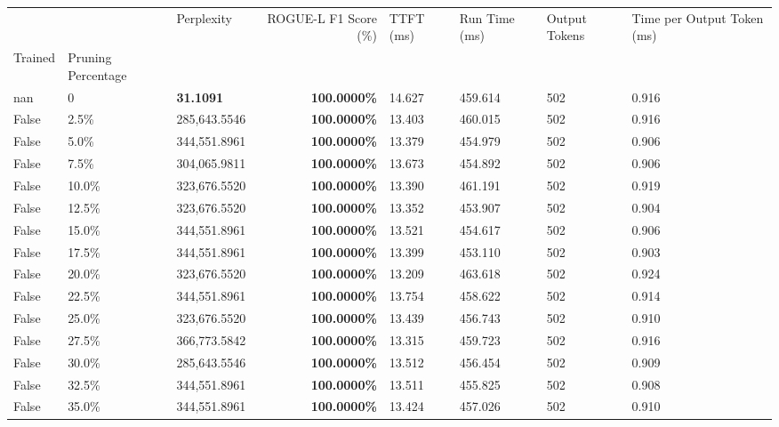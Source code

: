 \begin{table}[H]
\label{tab:evaluation-pipeline-11-untrained}
\begin{tabular}{lllrllll}
\toprule
 &  & Perplexity & ROGUE-L F1 Score (\%) & TTFT (ms) & Run Time (ms) & Output Tokens & Time per Output Token (ms) \\
Trained & Pruning Percentage &  &  &  &  &  &  \\
\midrule
nan & 0 & \bfseries 31.1091 & \bfseries 100.0000\% & 14.627 & 459.614 & 502 & 0.916 \\
\cline{1-8}
False & 2.5\% & \color{red} 285,643.5546 & \bfseries \color{red} 100.0000\% & 13.403 & 460.015 & 502 & 0.916 \\
\cline{1-8}
False & 5.0\% & 344,551.8961 & \bfseries \color{red} 100.0000\% & 13.379 & 454.979 & 502 & 0.906 \\
\cline{1-8}
False & 7.5\% & 304,065.9811 & \bfseries \color{red} 100.0000\% & 13.673 & 454.892 & 502 & 0.906 \\
\cline{1-8}
False & 10.0\% & 323,676.5520 & \bfseries \color{red} 100.0000\% & 13.390 & 461.191 & 502 & 0.919 \\
\cline{1-8}
False & 12.5\% & 323,676.5520 & \bfseries \color{red} 100.0000\% & 13.352 & 453.907 & 502 & 0.904 \\
\cline{1-8}
False & 15.0\% & 344,551.8961 & \bfseries \color{red} 100.0000\% & 13.521 & 454.617 & 502 & 0.906 \\
\cline{1-8}
False & 17.5\% & 344,551.8961 & \bfseries \color{red} 100.0000\% & 13.399 & 453.110 & 502 & 0.903 \\
\cline{1-8}
False & 20.0\% & 323,676.5520 & \bfseries \color{red} 100.0000\% & 13.209 & 463.618 & 502 & 0.924 \\
\cline{1-8}
False & 22.5\% & 344,551.8961 & \bfseries \color{red} 100.0000\% & 13.754 & 458.622 & 502 & 0.914 \\
\cline{1-8}
False & 25.0\% & 323,676.5520 & \bfseries \color{red} 100.0000\% & 13.439 & 456.743 & 502 & 0.910 \\
\cline{1-8}
False & 27.5\% & 366,773.5842 & \bfseries \color{red} 100.0000\% & 13.315 & 459.723 & 502 & 0.916 \\
\cline{1-8}
False & 30.0\% & \color{red} 285,643.5546 & \bfseries \color{red} 100.0000\% & 13.512 & 456.454 & 502 & 0.909 \\
\cline{1-8}
False & 32.5\% & 344,551.8961 & \bfseries \color{red} 100.0000\% & 13.511 & 455.825 & 502 & 0.908 \\
\cline{1-8}
False & 35.0\% & 344,551.8961 & \bfseries \color{red} 100.0000\% & 13.424 & 457.026 & 502 & 0.910 \\

\end{tabular}
\end{table}
